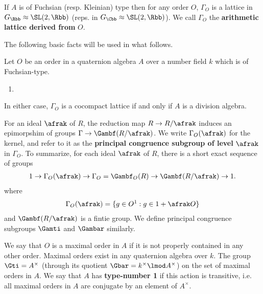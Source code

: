 If $A$ is of Fuchsian (resp. Kleinian) type then  for any order $O$,   $\Gamma_O$ is a lattice in $G_\Rbb  \approx \SL(2,\Rbb)$ (reps. in $G_\Cbb\approx \SL(2,\Rbb)$). We call $\Gamma_O$ the \textbf{arithmetic lattice derived from} $O$.

The following basic facts will be used in what follows.
\begin{facts}
    Let $O$ be an order in a quaternion algebra $A$ over a number field $k$ which is of Fuchsian-type.
    \begin{enumerate}
        \item
    \end{enumerate}
\end{facts}

In either case, $\Gamma_O$ is a cocompact lattice if and only if $A$ is a division algebra.



For an ideal $\afrak$ of $R$, the reduction map $R \to R/\afrak$ induces an epimorpshim of groups $\Gamma \to \Gambf (R/\afrak)$. We write $\Gamma_O(\afrak)$ for the kernel, and refer to it as the \textbf{principal congruence subgroup of level } $\afrak$ in $\Gamma_O$. To summarize, for each ideal $\afrak$ of $R$, there is a short exact sequence of groups
\begin{align*}
    1 \to \Gamma_O (\afrak) \to \Gamma_O=\Gambf_O(R) \to \Gambf (R/\afrak) \to 1.
\end{align*}
where
\begin{align*}
    \Gamma_O(\afrak) = \{ g \in O^1: g \in 1 + \afrak O\}
\end{align*}
and $\Gambf (R/\afrak)$ is a fintie group. We define principal congruence subgroups $\Gamti$ and $\Gambar$ similarly.



We say that $O$ is a maximal order in $A$ if it is not properly contained in any other order. Maximal orders exist in any quaternion algebra over $k$. The group $\Gti = A^\times$ (through its quotient $\Gbar = k^\times \lmod A^\times$) on the set of maximal orders in $A$. We say that $A$ has  \textbf{type-number 1} if this action is transitive, i.e. all maximal orders in $A$ are conjugate by an element of $A^\times$.






